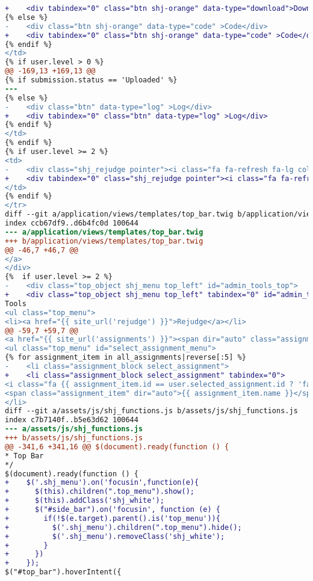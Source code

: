 \begin{itemize}
\begin{lstlisting}[language=diff, caption=Perubahan untuk mematuhi kriteria 2.1.1, label=lst_2.1.1, basicstyle=\ttfamily, frame=single,
columns=fullflexible, keepspaces=true, breaklines=true]
+    <div tabindex="0" class="btn shj-orange" data-type="download">Download</div>
{% else %}
-    <div class="btn shj-orange" data-type="code" >Code</div>
+    <div tabindex="0" class="btn shj-orange" data-type="code" >Code</div>
{% endif %}
</td>
{% if user.level > 0 %}
@@ -169,13 +169,13 @@
{% if submission.status == 'Uploaded' %}
---
{% else %}
-    <div class="btn" data-type="log" >Log</div>
+    <div tabindex="0" class="btn" data-type="log" >Log</div>
{% endif %}
</td>
{% endif %}
{% if user.level >= 2 %}
<td>
-    <div class="shj_rejudge pointer"><i class="fa fa-refresh fa-lg color10"></i></div>
+    <div tabindex="0" class="shj_rejudge pointer"><i class="fa fa-refresh fa-lg color10"></i></div>
</td>
{% endif %}
</tr>
diff --git a/application/views/templates/top_bar.twig b/application/views/templates/top_bar.twig
index ccb67df9..d6b4fc0d 100644
--- a/application/views/templates/top_bar.twig
+++ b/application/views/templates/top_bar.twig
@@ -46,7 +46,7 @@
</a>
</div>
{%  if user.level >= 2 %}
-    <div class="top_object shj_menu top_left" id="admin_tools_top">
+    <div class="top_object shj_menu top_left" tabindex="0" id="admin_tools_top">
Tools
<ul class="top_menu">
<li><a href="{{ site_url('rejudge') }}">Rejudge</a></li>
@@ -59,7 +59,7 @@
<a href="{{ site_url('assignments') }}"><span dir="auto" class="assignment_name">{{ user.selected_assignment.name|length > 30 ? user.selected_assignment.name|slice(0, 30) ~ '...' : user.selected_assignment.name }}</span></a>
<ul class="top_menu" id="select_assignment_menu">
{% for assignment_item in all_assignments|reverse[:5] %}
-    <li class="assignment_block select_assignment">
+    <li class="assignment_block select_assignment" tabindex="0">
<i class="fa {{ assignment_item.id == user.selected_assignment.id ? 'fa-check-square-o color6' : 'fa-square-o' }}" data-id="{{ assignment_item.id }}"></i>
<span class="assignment_item" dir="auto">{{ assignment_item.name }}</span>
</li>
diff --git a/assets/js/shj_functions.js b/assets/js/shj_functions.js
index c7b7140f..b5e63d62 100644
--- a/assets/js/shj_functions.js
+++ b/assets/js/shj_functions.js
@@ -341,6 +341,16 @@ $(document).ready(function () {
* Top Bar
*/
$(document).ready(function () {
+    $('.shj_menu').on('focusin',function(e){
+      $(this).children(".top_menu").show();
+      $(this).addClass('shj_white');
+      $("#side_bar").on('focusin', function (e) {
+        if(!$(e.target).parent().is('top_menu')){
+          $('.shj_menu').children(".top_menu").hide();
+          $('.shj_menu').removeClass('shj_white');
+        }
+      })
+    });
$("#top_bar").hoverIntent({

\end{lstlisting}
\end{itemize}
